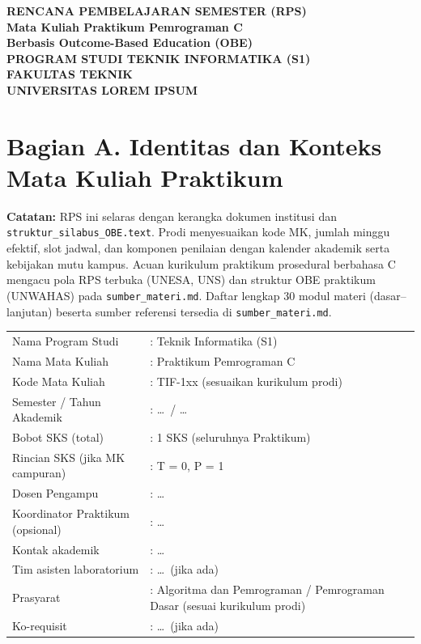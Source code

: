 \documentclass[12pt,a4paper]{article}
\begin{document}
\begin{center}
\textbf{\Large RENCANA PEMBELAJARAN SEMESTER (RPS)}\\
\textbf{Mata Kuliah Praktikum Pemrograman C}\\
\textbf{Berbasis Outcome-Based Education (OBE)}\\[0.5cm]
\textbf{PROGRAM STUDI TEKNIK INFORMATIKA (S1)}\\
\textbf{FAKULTAS TEKNIK}\\
\textbf{UNIVERSITAS LOREM IPSUM}\\
\end{center}

\vspace{0.75cm}

\section*{Bagian A. Identitas dan Konteks Mata Kuliah Praktikum}

\noindent\textbf{Catatan:} RPS ini selaras dengan kerangka dokumen institusi dan \texttt{struktur\_silabus\_OBE.text}. Prodi menyesuaikan kode MK, jumlah minggu efektif, slot jadwal, dan komponen penilaian dengan kalender akademik serta kebijakan mutu kampus. Acuan kurikulum praktikum prosedural berbahasa C mengacu pola RPS terbuka (UNESA, UNS) dan struktur OBE praktikum (UNWAHAS) pada \texttt{sumber\_materi.md}. Daftar lengkap 30 modul materi (dasar--lanjutan) beserta sumber referensi tersedia di \texttt{sumber\_materi.md}.

\begin{tabular}{@{}p{5.2cm}p{9.5cm}@{}}
Nama Program Studi & : Teknik Informatika (S1) \\
Nama Mata Kuliah & : Praktikum Pemrograman C \\
Kode Mata Kuliah & : TIF-1xx (sesuaikan kurikulum prodi) \\
Semester / Tahun Akademik & : \ldots\ / \ldots \\
Bobot SKS (total) & : 1 SKS (seluruhnya Praktikum) \\
Rincian SKS (jika MK campuran) & : T = 0, P = 1 \\
Dosen Pengampu & : \ldots \\
Koordinator Praktikum (opsional) & : \ldots \\
Kontak akademik & : \ldots \\
Tim asisten laboratorium & : \ldots\ (jika ada) \\
Prasyarat & : Algoritma dan Pemrograman / Pemrograman Dasar (sesuai kurikulum prodi) \\
Ko-requisit & : \ldots\ (jika ada) \\
\end{tabular}
\end{document}
